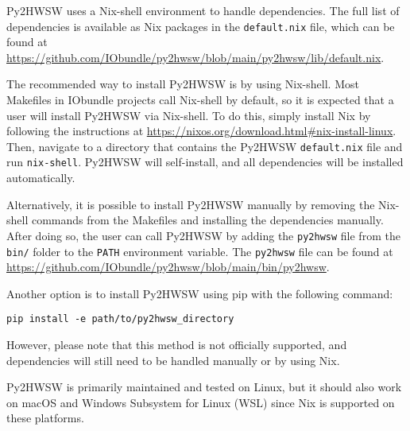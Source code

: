 %

Py2HWSW uses a Nix-shell environment to handle dependencies. The full list of dependencies is available as Nix packages in the \texttt{default.nix} file, which can be found at \url{https://github.com/IObundle/py2hwsw/blob/main/py2hwsw/lib/default.nix}.

The recommended way to install Py2HWSW is by using Nix-shell. Most Makefiles in IObundle projects call Nix-shell by default, so it is expected that a user will install Py2HWSW via Nix-shell. To do this, simply install Nix by following the instructions at \url{https://nixos.org/download.html#nix-install-linux}. Then, navigate to a directory that contains the Py2HWSW \texttt{default.nix} file and run \texttt{nix-shell}. Py2HWSW will self-install, and all dependencies will be installed automatically.

Alternatively, it is possible to install Py2HWSW manually by removing the Nix-shell commands from the Makefiles and installing the dependencies manually. After doing so, the user can call Py2HWSW by adding the \texttt{py2hwsw} file from the \texttt{bin/} folder to the \texttt{PATH} environment variable. The \texttt{py2hwsw} file can be found at \url{https://github.com/IObundle/py2hwsw/blob/main/bin/py2hwsw}.

Another option is to install Py2HWSW using pip with the following command:
\begin{verbatim}
pip install -e path/to/py2hwsw_directory
\end{verbatim}
However, please note that this method is not officially supported, and dependencies will still need to be handled manually or by using Nix.

Py2HWSW is primarily maintained and tested on Linux, but it should also work on macOS and Windows Subsystem for Linux (WSL) since Nix is supported on these platforms.
